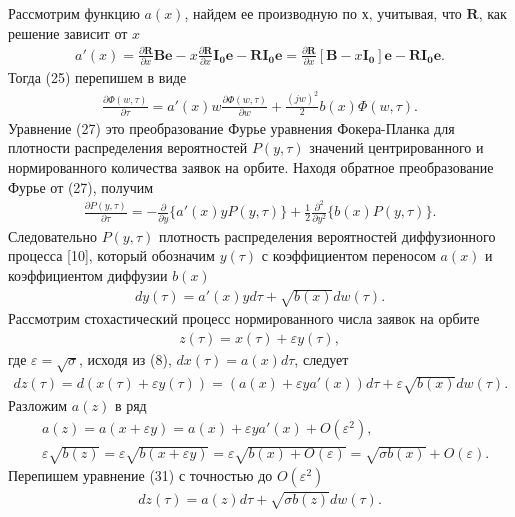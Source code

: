 Рассмотрим функцию $a(x)$, найдем ее производную по $х$, учитывая, что $\boldsymbol{R}$, как решение зависит от $x$
\begin{align*}
	a'(x)=\frac{\partial \boldsymbol{R}}{\partial x}\boldsymbol{Be}-x\frac{\partial \boldsymbol{R}}{\partial x}\boldsymbol{I_{0}} \boldsymbol{e}-\boldsymbol{RI_{0}e}=\frac{\partial \boldsymbol{R}}{\partial x}[\boldsymbol{B}-x\boldsymbol{I_{0}}] \boldsymbol{e}-\boldsymbol{RI_{0}e}.
\end{align*}
Тогда (25) перепишем в виде
\begin{align}
	\frac{\partial \Phi (w,\tau)}{\partial \tau}=a'(x) w\frac{\partial \Phi (w,\tau)}{\partial w}+\frac{(jw)^2}{2}b(x)\Phi(w,\tau).
\end{align}
Уравнение (27) это преобразование Фурье уравнения Фокера-Планка для плотности распределения вероятностей $P(y, \tau )$ значений центрированного и нормированного количества заявок на орбите. Находя обратное преобразование Фурье от (27), получим
\begin{align}
	\frac{\partial P (y,\tau)}{\partial \tau}=-\frac{\partial}{\partial y}\{a'(x)yP(y,\tau)\} 
	+\frac{1}{2}\frac{\partial^2}{\partial y^2}\{b(x)P(y,\tau)\}.
\end{align}
Следовательно $P (y,\tau)$ плотность распределения вероятностей диффузионного процесса [10], который обозначим $y(\tau)$ с коэффициентом переносом $a(x)$ и коэффициентом диффузии $b(x)$
\begin{align}
	dy(\tau)=a'(x)yd\tau+\sqrt{b(x)}dw(\tau).
\end{align}
Рассмотрим стохастический процесс нормированного числа заявок на орбите
\begin{align}
	z(\tau)=x(\tau)+\varepsilon y(\tau),
\end{align}
где $\varepsilon=\sqrt{\sigma}$, исходя из (8), $dx(\tau)=a(x)d\tau$, следует
\begin{align}
	dz(\tau)=d(x(\tau)+\varepsilon y(\tau))=(a(x)+\varepsilon ya'(x))d\tau+\varepsilon \sqrt{b(x)}dw(\tau).
\end{align}
Разложим $a(z)$ в ряд 
\begin{align*}
	&a(z)=a(x+\varepsilon y)=a(x)+\varepsilon y a'(x)+O(\varepsilon^2),\\
	&\varepsilon\sqrt{b(z)}=\varepsilon\sqrt{b(x+\varepsilon y)}=\varepsilon\sqrt{b(x)+O(\varepsilon)}=\sqrt{\sigma b(x)}+O(\varepsilon).
\end{align*}
Перепишем уравнение (31) с точностью до $O(\varepsilon^2)$
\begin{align}
	dz(\tau)=a(z)d\tau+\sqrt{\sigma b(z)}dw(\tau).
\end{align}
